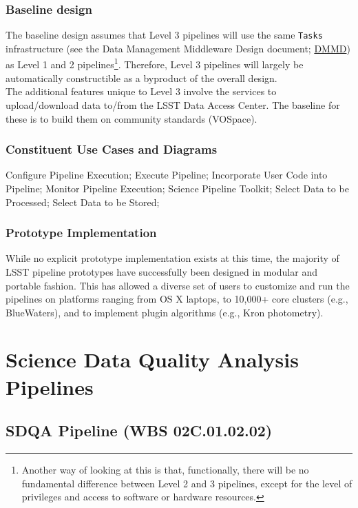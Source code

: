 \documentclass[12pt]{article}
\newcommand{\ds}[2]{{\color{blue} \href{https://docushare.lsstcorp.org/docushare/dsweb/Get/#1}{#2}}\xspace}
\newcommand{\DMMD}{\ds{LDM-152}{DMMD}}
\newcommand{\wbsSDQAP}{WBS 02C.01.02.02}
\begin{document}
\subsubsection{Baseline design}

The baseline design assumes that Level 3 pipelines will use the same {\tt Tasks} infrastructure (see the Data Management Middleware Design document; \DMMD) as Level 1 and 2 pipelines\footnote{Another way of looking at this is that, functionally, there will be no fundamental difference between Level 2 and 3 pipelines, except for the level of privileges and access to software or hardware resources.}. Therefore, Level 3 pipelines will largely be automatically constructible as a byproduct of the overall design.
\\

The additional features unique to Level 3 involve the services to upload/download data to/from the LSST Data Access Center. The baseline for these is to build them on community standards (VOSpace).

\subsubsection{Constituent Use Cases and Diagrams}

Configure Pipeline Execution; Execute Pipeline; Incorporate User Code into Pipeline; Monitor Pipeline Execution; Science Pipeline Toolkit; Select Data to be Processed; Select Data to be Stored;

\subsubsection{Prototype Implementation}

While no explicit prototype implementation exists at this time, the majority of LSST pipeline prototypes have successfully been designed in modular and portable fashion. This has allowed a diverse set of users to customize and run the pipelines on platforms ranging from OS X laptops, to 10,000+ core clusters (e.g., BlueWaters), and to implement plugin algorithms (e.g., Kron photometry).

\clearpage

\section{Science Data Quality Analysis Pipelines}

\subsection{SDQA Pipeline (\wbsSDQAP)}
\end{document}
